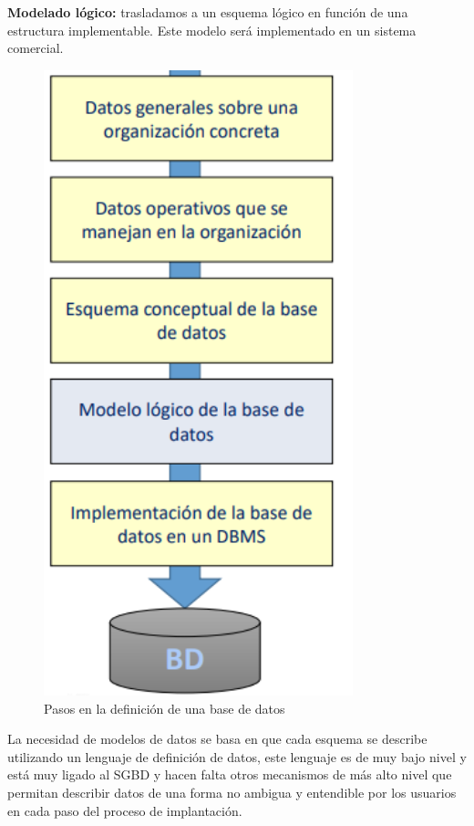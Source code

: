 \documentclass[a4paper,11pt]{article}
\begin{document}
\textbf{Modelado lógico:} trasladamos a un esquema lógico en función de una estructura implementable. Este modelo será implementado en un sistema comercial.

\begin{figure}
\centering
\includegraphics[scale=1,width=0.8\textwidth]{definicion_modelo_datos.png}
\caption{Pasos en la definición de una base de datos}
\end{figure}

La necesidad de modelos de datos se basa en que cada esquema se describe utilizando un lenguaje de definición de datos, este lenguaje es de muy bajo nivel y está muy ligado al SGBD y hacen falta otros mecanismos de más alto nivel que permitan describir datos de una forma no ambigua y entendible por los usuarios en cada paso del proceso de implantación. \\
\end{document}
